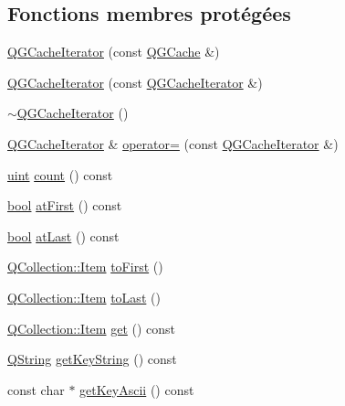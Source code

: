 \subsection*{Fonctions membres protégées}
\begin{DoxyCompactItemize}
\item 
\hyperlink{class_q_g_cache_iterator_afc9bb849ad168bddde02db9807309bda}{Q\+G\+Cache\+Iterator} (const \hyperlink{class_q_g_cache}{Q\+G\+Cache} \&)
\item 
\hyperlink{class_q_g_cache_iterator_ab05bed43b4aa7b87e0719539bb465f82}{Q\+G\+Cache\+Iterator} (const \hyperlink{class_q_g_cache_iterator}{Q\+G\+Cache\+Iterator} \&)
\item 
\hyperlink{class_q_g_cache_iterator_a63e27913e55189078379a86b8f63fc57}{$\sim$\+Q\+G\+Cache\+Iterator} ()
\item 
\hyperlink{class_q_g_cache_iterator}{Q\+G\+Cache\+Iterator} \& \hyperlink{class_q_g_cache_iterator_a89d2f501aee1742a97759c96bf3145e5}{operator=} (const \hyperlink{class_q_g_cache_iterator}{Q\+G\+Cache\+Iterator} \&)
\item 
\hyperlink{qglobal_8h_a4d3943ddea65db7163a58e6c7e8df95a}{uint} \hyperlink{class_q_g_cache_iterator_a38b9d6b0f4375565cd58d8dab5669f99}{count} () const 
\item 
\hyperlink{qglobal_8h_a1062901a7428fdd9c7f180f5e01ea056}{bool} \hyperlink{class_q_g_cache_iterator_acedcadcb31a823baf74467033debbe1a}{at\+First} () const 
\item 
\hyperlink{qglobal_8h_a1062901a7428fdd9c7f180f5e01ea056}{bool} \hyperlink{class_q_g_cache_iterator_a10bac1d57d88fdbf8b204209567c759a}{at\+Last} () const 
\item 
\hyperlink{class_q_collection_ac6f3ddbf999e31fb797927f71ae6b5d7}{Q\+Collection\+::\+Item} \hyperlink{class_q_g_cache_iterator_a9ae73b4d131832f6682352038810797e}{to\+First} ()
\item 
\hyperlink{class_q_collection_ac6f3ddbf999e31fb797927f71ae6b5d7}{Q\+Collection\+::\+Item} \hyperlink{class_q_g_cache_iterator_af6c9216f68a2422b468e05911dfdbbf1}{to\+Last} ()
\item 
\hyperlink{class_q_collection_ac6f3ddbf999e31fb797927f71ae6b5d7}{Q\+Collection\+::\+Item} \hyperlink{class_q_g_cache_iterator_a87e0f344e3f40b6f8bbf51186b8bd71a}{get} () const 
\item 
\hyperlink{class_q_string}{Q\+String} \hyperlink{class_q_g_cache_iterator_ab1eb9ac8af2eb032c33e76a65bb5eaec}{get\+Key\+String} () const 
\item 
const char $\ast$ \hyperlink{class_q_g_cache_iterator_a249f80b321bef9ddad3238daff7460c5}{get\+Key\+Ascii} () const 

\end{DoxyCompactItemize}
